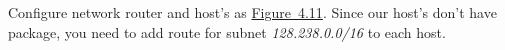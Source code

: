 \documentclass{../UTNetLab}
\begin{document}
    
    Configure network router and host’s as \hyperref[fig:4.11]{Figure~4.11}.
    Since our host’s don’t have  package, you need to add route for subnet \textit{128.238.0.0/16} to each host.
\end{document}
